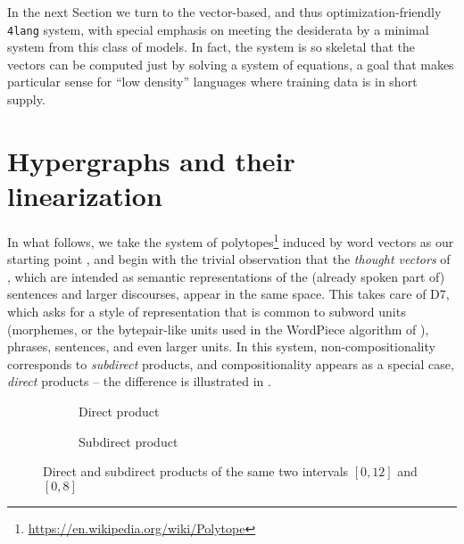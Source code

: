 \documentclass[output=paper,colorlinks=true,citecolor=brown]{langscibook}
\begin{document}
In the next Section we turn to the vector-based, and thus
optimization-friendly \texttt{4lang} system, with special emphasis on meeting
the desiderata by a minimal system from this class of models. In fact, the
system is so skeletal that the vectors can be computed just by solving a
system of equations, a goal that makes particular sense for ``low density''
languages where training data is in short supply.

\section{Hypergraphs and their linearization}\label{4lang}

In what follows, we take the system of
polytopes\footnote{\url{https://en.wikipedia.org/wiki/Polytope}} induced by word
vectors as our starting point \citep{Kornai:2022}, and begin with the trivial
observation that the \textit{thought vectors} of \citet{LeCun:2015}, which are
intended as semantic representations of the (already spoken part of) sentences
and larger discourses, appear in the same space. This takes care of D7, which
asks for a style of representation that is common to subword units (morphemes,
or the bytepair-like units used in the WordPiece algorithm of \cite{Wu:2016}),
phrases, sentences, and even larger units. In this system,
non-compositionality corresponds to \textit{subdirect} products, and
compositionality appears as a special case, \textit{direct} products
\citep{Kornai:2010} -- the difference is illustrated in
.


\begin{figure}[h]
    \begin{subfigure}[t]{0.5\textwidth}
	\centering
        \caption{Direct product}
    \end{subfigure}%
    \begin{subfigure}[t]{0.5\textwidth}
        \centering
                \caption{Subdirect product}
    \end{subfigure}
    \caption{Direct and subdirect products of the same two intervals $[0,12]$ and $[0,8]$}\label{fig:dirsubdir}
\end{figure}
\end{document}

